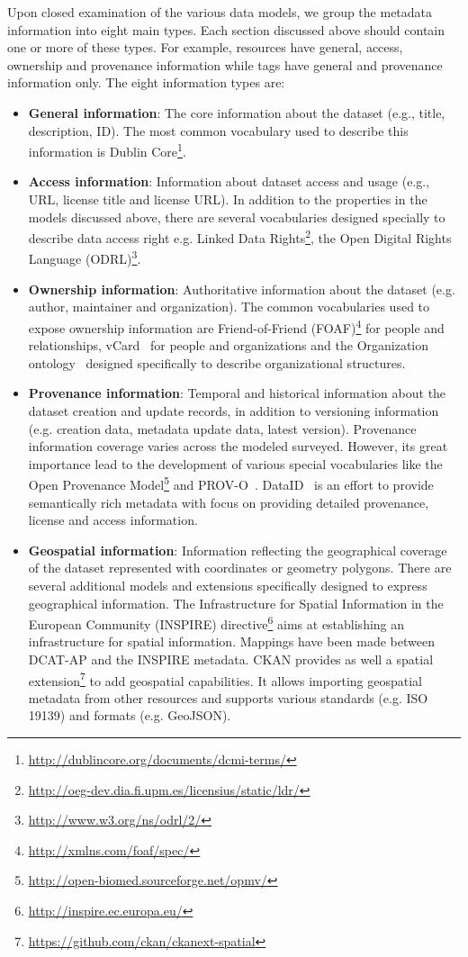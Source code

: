 Upon closed examination of the various data models, we group the metadata information into eight main types. Each section discussed above should contain one or more of these types. For example, resources have general, access, ownership and provenance information while tags have general and provenance information only. The eight information types are:
\begin{itemize}
 \item \textbf{General information}: The core information about the dataset (e.g., title, description, ID). The most common vocabulary used to describe this information is Dublin Core\footnote{\url{http://dublincore.org/documents/dcmi-terms/}}.
 \item \textbf{Access information}: Information about dataset access and usage (e.g., URL, license title and license URL). In addition to the properties in the models discussed above, there are several vocabularies designed specially to describe data access right e.g. Linked Data Rights\footnote{\url{http://oeg-dev.dia.fi.upm.es/licensius/static/ldr/}}, the Open Digital Rights Language (ODRL)\footnote{\url{http://www.w3.org/ns/odrl/2/}}.
 \item \textbf{Ownership information}: Authoritative information about the dataset (e.g. author, maintainer and organization). The common vocabularies used to expose ownership information are Friend-of-Friend (FOAF)\footnote{\url{http://xmlns.com/foaf/spec/}} for people and relationships, vCard~\cite{Iannella:W3C:14} for people and organizations and the Organization ontology~\cite{Reynolds:W3C:14} designed specifically to describe organizational structures.
 \item \textbf{Provenance information}: Temporal and historical information about the dataset creation and update records, in addition to versioning information (e.g. creation data, metadata update data, latest version). Provenance information coverage varies across the modeled surveyed. However, its great importance lead to the development of various special vocabularies like the Open Provenance Model\footnote{\url{http://open-biomed.sourceforge.net/opmv/}} and PROV-O~\cite{Lebo:W3C:13}. DataID~\cite{Brummer::ICSS:14} is an effort to provide semantically rich metadata with focus on providing detailed provenance, license and access information.
 \item \textbf{Geospatial information}: Information reflecting the geographical coverage of the dataset represented with coordinates or geometry polygons. There are several additional models and extensions specifically designed to express geographical information. The Infrastructure for Spatial Information in the European Community (INSPIRE) directive\footnote{\url{http://inspire.ec.europa.eu/}} aims at establishing an infrastructure for spatial information. Mappings have been made between DCAT-AP and the INSPIRE metadata. CKAN provides as well a spatial extension\footnote{\url{https://github.com/ckan/ckanext-spatial}} to add geospatial capabilities. It allows importing geospatial metadata from other resources and supports various standards (e.g. ISO 19139) and formats (e.g. GeoJSON).

\end{itemize}
